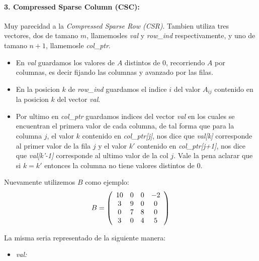 \paragraph{3. Compressed Sparse Column (CSC):}

Muy parecidad a la \textit{Compressed Sparse Row (CSR)}.
 Tambien utiliza tres vectores, dos de tamano $m$, llamemosles \textit{val} y \textit{row_ind} respectivamente, y uno de tamano $n+1$, llamemosle \textit{col_ptr}.

 \begin{itemize}
     \item En \textit{val} guardamos los valores de $A$ distintos de 0, recorriendo $A$ por columnas, es decir fijando las columnas y avanzado por las filas.
     \item En la posicion $k$ de \textit{row_ind} guardamos el indice $i$ del valor $A_{ij}$ contenido en la posicion $k$ del vector \textit{val}.
     \item Por ultimo en \textit{col_ptr} guardamos indices del vector \textit{val} en los cuales se encuentran el primera valor de cada columna, de tal forma que para la columna $j$, el valor $k$ contenido en \textit{col_ptr[j]}, nos dice que \textit{val[k]} corresponde al primer valor de la fila $j$ y el valor $k'$ contenido en \textit{col_ptr[j+1]}, nos dice que \textit{val[k'-1]} corresponde al ultimo valor de la col $j$. Vale la pena aclarar que si $k = k'$ entonces la columna no tiene valores distintos de 0.
 \end{itemize}

Nuevamente utilizemos $B$ como ejemplo:
\[
  B = \left(\begin{array}{*5{c}}
    10 & 0 & 0 & -2\\
    3  & 9 & 0 & 0 \\
    0  & 7 & 8 & 0 \\
    3  & 0 & 4 & 5
  \end{array}\right)
\]

La misma seria representado de la siguiente manera:
\begin{itemize}
  \item \textit{val:}
\end{itemize}

\begin{center}
\end{center}

